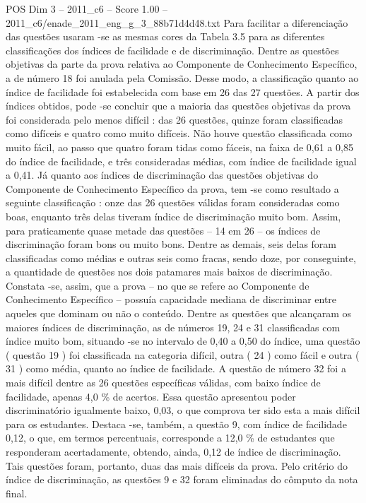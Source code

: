 \begin{textsample}{POS Dim 3 – 2011\_c6 – Score 1.00 – 2011\_c6/enade\_2011\_eng\_g\_3\_88b71d4d48.txt}
Para facilitar a diferenciação das questões usaram -se as mesmas cores da Tabela 3.5 para as diferentes classificações dos índices de facilidade e de discriminação.
Dentre as questões objetivas da parte da prova relativa ao Componente de Conhecimento Específico, a de número 18 foi anulada pela Comissão.
Desse modo, a classificação quanto ao índice de facilidade foi estabelecida com base em 26 das 27 questões.
A partir dos índices obtidos, pode -se concluir que a maioria das questões objetivas da prova foi considerada pelo menos difícil : das 26 questões, quinze foram classificadas como difíceis e quatro como muito difíceis.
Não houve questão classificada como muito fácil, ao passo que quatro foram tidas como fáceis, na faixa de 0,61 a 0,85 do índice de facilidade, e três consideradas médias, com índice de facilidade igual a 0,41.
Já quanto aos índices de discriminação das questões objetivas do Componente de Conhecimento Específico da prova, tem -se como resultado a seguinte classificação : onze das 26 questões válidas foram consideradas como boas, enquanto três delas tiveram índice de discriminação muito bom.
Assim, para praticamente quase metade das questões – 14 em 26 – os índices de discriminação foram bons ou muito bons.
Dentre as demais, seis delas foram classificadas como médias e outras seis como fracas, sendo doze, por conseguinte, a quantidade de questões nos dois patamares mais baixos de discriminação.
Constata -se, assim, que a prova – no que se refere ao Componente de Conhecimento Específico – possuía capacidade mediana de discriminar entre aqueles que dominam ou não o conteúdo.
Dentre as questões que alcançaram os maiores índices de discriminação, as de números 19, 24 e 31 classificadas com índice muito bom, situando -se no intervalo de 0,40 a 0,50 do índice, uma questão ( questão 19 ) foi classificada na categoria difícil, outra ( 24 ) como fácil e outra ( 31 ) como média, quanto ao índice de facilidade.
A questão de número 32 foi a mais difícil dentre as 26 questões específicas válidas, com baixo índice de facilidade, apenas 4,0 \% de acertos.
Essa questão apresentou poder discriminatório igualmente baixo, 0,03, o que comprova ter sido esta a mais difícil para os estudantes.
Destaca -se, também, a questão 9, com índice de facilidade 0,12, o que, em termos percentuais, corresponde a 12,0 \% de estudantes que responderam acertadamente, obtendo, ainda, 0,12 de índice de discriminação.
Tais questões foram, portanto, duas das mais difíceis da prova.
Pelo critério do índice de discriminação, as questões 9 e 32 foram eliminadas do cômputo da nota final.

\end{textsample}
